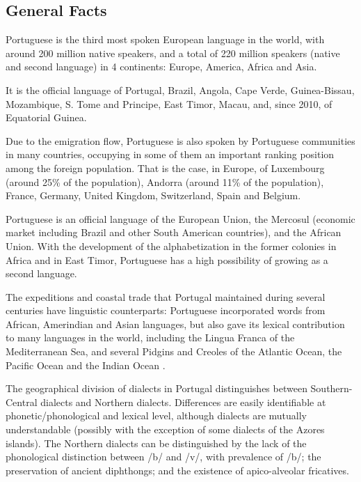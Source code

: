 \documentclass[]{../metanetpaper}
\begin{document}
\clearpage


\begin{multicols}{2}

\subsection{General Facts}

Portuguese is the third most spoken European language in the world, with around 200 million native speakers, and a total of 220 million speakers (native and second language) in 4 continents: Europe, America, Africa and Asia\cite{observatorio}\cite{ethnologue}. 

   It is the official language of Portugal, Brazil, Angola, Cape Verde, Guinea-Bissau, Mozambique, S. Tome and Principe, East Timor, Macau, and, since 2010, of Equatorial Guinea. 

   Due to the emigration flow\cite{stat1}\cite{obsemig}, Portuguese is also spoken by Portuguese communities in many countries, occupying in some of them an important ranking position among the foreign population. That is the case, in Europe, of Luxembourg (around 25\% of the population), Andorra (around 11\% of the population), France, Germany, United Kingdom, Switzerland, Spain and Belgium\cite{linha}.


 Portuguese is an official language of the European Union, the Mercosul (economic market including Brazil and other South American countries), and the African Union. With the development of the alphabetization in the former colonies in Africa and in East Timor, Portuguese has a high possibility of growing as a second language. 

The expeditions and coastal trade that Portugal maintained during several centuries have linguistic counterparts: Portuguese incorporated words from African, Amerindian and Asian languages, but also gave its lexical contribution to many languages in the world, including the Lingua Franca of the Mediterranean Sea, and several Pidgins and Creoles of the Atlantic Ocean, the Pacific Ocean and the Indian Ocean\cite{andrade} \cite{camoes}.

   The geographical division of dialects in Portugal\cite{cintra} distinguishes between Southern-Central dialects and Northern dialects. Differences are easily identifiable at phonetic/phonological and lexical level, although dialects are mutually understandable (possibly with the exception of some dialects of the Azores islands). The Northern dialects can be distinguished by the lack of the phonological distinction between /b/ and /v/, with prevalence of /b/; the preservation of ancient diphthongs; and the existence of apico-alveolar fricatives. 


\end{multicols}
\end{document}
